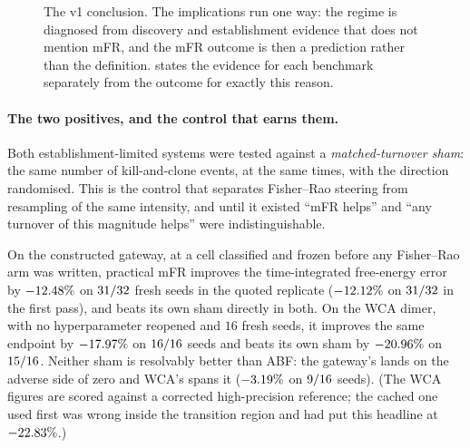 \begin{figure}[!ht]\centering
  \caption{The v1 conclusion. The implications run one way: the regime is diagnosed from
  discovery and establishment evidence that does not mention mFR, and the mFR outcome is then
  a prediction rather than the definition.  states the evidence for each
  benchmark separately from the outcome for exactly this reason.}
  \label{fig:boxed_conclusion}
\end{figure}

\paragraph{The two positives, and the control that earns them.}
Both establishment-limited systems were tested against a \emph{matched-turnover sham}: the
same number of kill-and-clone events, at the same times, with the direction randomised. This
is the control that separates Fisher--Rao steering from resampling of the same intensity, and
until it existed ``mFR helps'' and ``any turnover of this magnitude helps'' were
indistinguishable.

On the constructed gateway, at a cell classified and frozen before any Fisher--Rao arm was
written, practical mFR improves the time-integrated free-energy error by
$-12.48\%$ on $31/32$ fresh seeds in the quoted replicate
($-12.12\%$ on $31/32$ in the first pass), and beats its own sham
directly in both. On the WCA dimer, with no hyperparameter reopened and $16$ fresh seeds, it
improves the same endpoint by $-17.97\%$ on $16/16$ seeds and beats its own
sham by $-20.96\%$ on $15/16$. Neither sham is resolvably better than ABF: the
gateway's lands on the adverse side of zero and WCA's spans it
($-3.19\%$ on $9/16$ seeds). (The WCA figures are scored against a corrected
high-precision reference; the cached one used first was wrong inside the transition region
and had put this headline at $-22.83\%$.)

